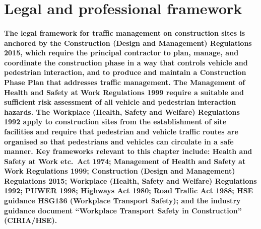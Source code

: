 \section{Legal and professional framework}

\paragraph{The legal framework for traffic management on construction sites is anchored by the Construction (Design and Management) Regulations 2015, which require the principal contractor to plan, manage, and coordinate the construction phase in a way that controls vehicle and pedestrian interaction, and to produce and maintain a Construction Phase Plan that addresses traffic management. The Management of Health and Safety at Work Regulations 1999 require a suitable and sufficient risk assessment of all vehicle and pedestrian interaction hazards. The Workplace (Health, Safety and Welfare) Regulations 1992 apply to construction sites from the establishment of site facilities and require that pedestrian and vehicle traffic routes are organised so that pedestrians and vehicles can circulate in a safe manner. Key frameworks relevant to this chapter include: Health and Safety at Work etc.\ Act 1974; Management of Health and Safety at Work Regulations 1999; Construction (Design and Management) Regulations 2015; Workplace (Health, Safety and Welfare) Regulations 1992; PUWER 1998; Highways Act 1980; Road Traffic Act 1988; HSE guidance HSG136 (Workplace Transport Safety); and the industry guidance document ``Workplace Transport Safety in Construction'' (CIRIA/HSE).}

